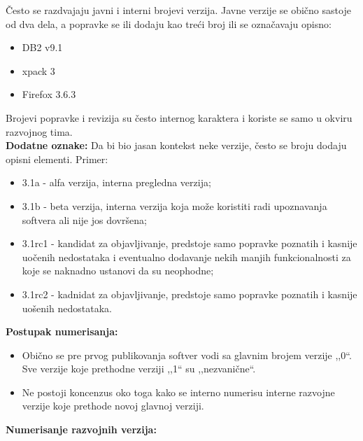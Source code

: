 \documentclass[a4paper]{article}
\begin{document}
  Često se razdvajaju javni i interni brojevi verzija. Javne verzije se obično sastoje od dva dela, 
  a popravke se ili dodaju kao treći broj ili se označavaju opisno:
  \begin{itemize}
    \item DB2 v9.1 
    \item xpack 3
    \item Firefox 3.6.3
  \end{itemize}
  Brojevi popravke i revizija su često internog karaktera i koriste se samo u okviru razvojnog tima.\\
  \textbf{Dodatne oznake:} Da bi bio jasan kontekst neke verzije, često se broju dodaju opisni 
  elementi. Primer:
  \begin{itemize}
    \item 3.1a - alfa verzija, interna pregledna verzija;
    \item 3.1b - beta verzija, interna verzija koja može koristiti radi upoznavanja softvera 
          ali nije jos dovršena;
    \item 3.1rc1 - kandidat za objavljivanje, predstoje samo popravke poznatih i 
          kasnije uočenih nedostataka i eventualno dodavanje nekih manjih funkcionalnosti 
          za koje se naknadno ustanovi da su neophodne;
    \item 3.1rc2 - kadnidat za objavljivanje, predstoje samo popravke poznatih i 
          kasnije uošenih nedostataka.
  \end{itemize}
  \textbf{Postupak numerisanja:} 
  \begin{itemize}
    \item Obično se pre prvog publikovanja softver vodi sa glavnim brojem 
          verzije ,,0``. Sve verzije koje prethodne verziji ,,1`` su ,,nezvanične``. 
    \item Ne postoji koncenzus oko 
          toga kako se interno numerisu interne razvojne verzije koje prethode novoj 
          glavnoj verziji.
  \end{itemize}
  \textbf{Numerisanje razvojnih verzija:}
\end{document}
